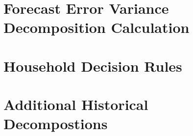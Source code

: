 \documentclass[11pt]{article}
\numberwithin{equation}{section} %
\numberwithin{figure}{section} %
\numberwithin{table}{section} %
\begin{document}
\section{Forecast Error Variance Decomposition Calculation} \label{app:fevd}

\FloatBarrier

\section{Household Decision Rules} \label{app:dec-rules}

\FloatBarrier

\section{Additional Historical Decompostions} \label{app:hist-decomp}

\FloatBarrier
\end{document}
